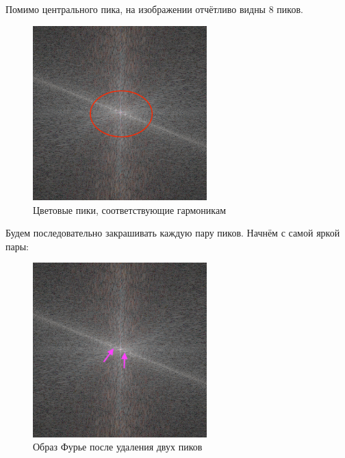 Помимо центрального пика, на изображении отчётливо видны 8 пиков.
\clearpage
\begin{figure}[ht!]
    \centering
    \includegraphics[width=0.6\textwidth]{images/result/task_1/Fourier_8_peaks.png}
    \caption{Цветовые пики, соответствующие гармоникам}
    \label{fig:image_8_peaks}
\end{figure}

Будем последовательно закрашивать каждую пару пиков. Начнём с самой яркой пары:

\begin{figure}[ht!]
    \centering
    \includegraphics[width=0.6\textwidth]{images/result/task_1/Fourier_8_modified_1_peaks.png}
    \caption{Образ Фурье после удаления двух пиков}
    \label{fig:image_8_m1}
\end{figure}

\vspace{2cm}


